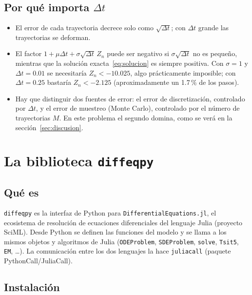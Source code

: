 \documentclass[11pt,a4paper]{article}
\begin{document}
\subsection{\texorpdfstring{Por qué importa $\Delta t$}{Por qué importa dt}}

\begin{itemize}
    \item El error de cada trayectoria decrece solo como $\sqrt{\Delta t}$; con $\Delta t$ grande las trayectorias se deforman.
    \item El factor $1 + \mu\Delta t + \sigma\sqrt{\Delta t}\,Z_n$ puede ser negativo si $\sigma\sqrt{\Delta t}$ no es pequeño, mientras que la solución exacta~\eqref{eq:solucion} es siempre positiva. Con $\sigma = 1$ y $\Delta t = 0.01$ se necesitaría $Z_n < -10.025$, algo prácticamente imposible; con $\Delta t = 0.25$ bastaría $Z_n < -2.125$ (aproximadamente un 1.7\,\% de los pasos).
    \item Hay que distinguir dos fuentes de error: el error de discretización, controlado por $\Delta t$, y el error de muestreo (Monte Carlo), controlado por el número de trayectorias $M$. En este problema el segundo domina, como se verá en la sección~\ref{sec:discusion}.
\end{itemize}

\section{La biblioteca \texttt{diffeqpy}}

\subsection{Qué es}

\texttt{diffeqpy} es la interfaz de Python para \texttt{DifferentialEquations.jl}, el ecosistema de resolución de ecuaciones diferenciales del lenguaje Julia (proyecto SciML). Desde Python se definen las funciones del modelo y se llama a los mismos objetos y algoritmos de Julia (\texttt{ODEProblem}, \texttt{SDEProblem}, \texttt{solve}, \texttt{Tsit5}, \texttt{EM}, \ldots). La comunicación entre los dos lenguajes la hace \texttt{juliacall} (paquete PythonCall/JuliaCall).

\subsection{Instalación}
\end{document}

